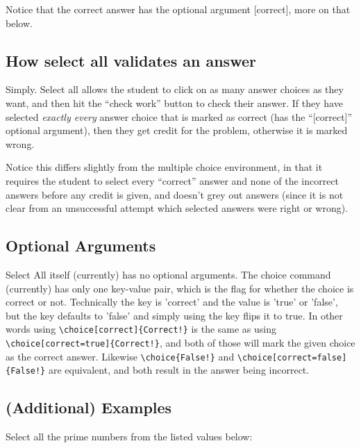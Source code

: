 \documentclass{ximera}
\begin{document}
        Notice that the correct answer has the optional argument [correct], more on that below.
            
            
        \subsection*{How select all validates an answer}
        
            Simply. Select all allows the student to click on as many answer choices as they want, and then hit the ``check work'' button to check their answer. If they have selected \textit{exactly every} answer choice that is marked as correct (has the ``[correct]'' optional argument), then they get credit for the problem, otherwise it is marked wrong. 
            
            Notice this differs slightly from the multiple choice environment, in that it requires the student to select every ``correct'' answer and none of the incorrect answers before any credit is given, and doesn't grey out answers (since it is not clear from an unsuccessful attempt which selected answers were right or wrong).
            
    \subsection*{Optional Arguments}
    
        Select All itself (currently) has no optional arguments. The choice command (currently) has only one key-value pair, which is the flag for whether the choice is correct or not. Technically the key is 'correct' and the value is 'true' or 'false', but the key defaults to 'false' and simply using the key flips it to true. In other words using \verb|\choice[correct]{Correct!}| is the same as using \verb|\choice[correct=true]{Correct!}|, and both of those will mark the given choice as the correct answer. Likewise \verb|\choice{False!}| and \verb|\choice[correct=false]{False!}| are equivalent, and both result in the answer being incorrect.
        
    \subsection*{(Additional) Examples}
    
        \begin{problem}
            Select all the prime numbers from the listed values below:
            \begin{selectAll}
            \end{selectAll}
        \end{problem}
        
\end{document}
